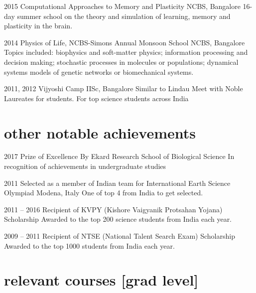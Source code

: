 \documentclass[11pt,print]{friggeri-cv}%
\begin{document}
\begin{entrylist}
  \entryy
    {2015}
    {Computational Approaches to Memory and Plasticity }
    {NCBS, Bangalore}
    {16-day summer school on the theory and simulation of learning, memory and plasticity in the brain.}    
\end{entrylist}
\begin{entrylist}
  \entryy
    {2014}
    {Physics of Life, NCBS-Simons Annual Monsoon School}
    {NCBS, Bangalore}
    {Topics included: biophysics and soft-matter physics; information processing and decision making; stochastic processes in molecules or populations; dynamical systems models of genetic networks or biomechanical systems.}    
\end{entrylist}
\begin{entrylist}
  \entryy
    {2011, 2012}
    {Vijyoshi Camp}
    {IISc, Bangalore}
    {Similar to Lindau Meet with Noble Laureates for students. For top  science students across India }
\end{entrylist}

\section{other notable achievements}

\begin{entrylist}
  \entryy
    {2017}
    {Prize of Excellence}
    {By Ekard Research School of Biological Science}
    {In recognition of achievements in undergraduate studies}
\end{entrylist}
\begin{entrylist}
  \entryy
    {2011}
    {Selected as a member of Indian team for International Earth Science Olympiad}
    {Modena, Italy}
    {One of top 4 from India to get selected.}
\end{entrylist}
\begin{entrylist}
  \entryy
    {2011 -- 2016}
    {Recipient of KVPY (Kishore Vaigyanik Protsahan Yojana) Scholarship}{}
    {Awarded to the top 200 science students from India each year.}

\end{entrylist}
\begin{entrylist}
  \entryy
    {2009 -- 2011}
    {Recipient of NTSE (National Talent Search Exam) Scholarship}{}
    {Awarded to the top 1000 students from India each year.}
\end{entrylist}


\section{relevant courses [grad level]}
\end{document}
